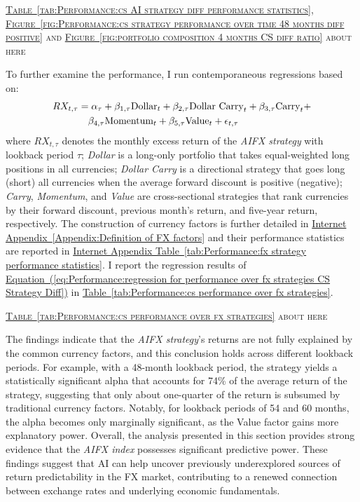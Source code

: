 \documentclass[12pt,oneside,letter]{article}
\newcommand*{\mytab}[1]{\hyperref[{#1}]{Table~\ref*{#1}}}
\newcommand*{\myfig}[1]{\hyperref[{#1}]{Figure~\ref*{#1}}}
\newcommand*{\myeq}[1]{\hyperref[{#1}]{Equation~(\ref*{#1})}}
\newcommand*{\mytabIA}[1]{\hyperref[{#1}]{Internet Appendix Table~\ref*{#1}}}
\newcommand*{\mysecIA}[1]{\hyperref[{#1}]{Internet Appendix~\ref*{#1}}}
\begin{document}
		\begin{center}
			 \textsc{\mytab{tab:Performance:cs AI strategy diff performance statistics}, \myfig{fig:Performance:cs strategy performance over time 48 months diff positive} and \myfig{fig:portfolio composition 4 months CS diff ratio} about here} 
		\end{center}
		To further examine the performance, I run contemporaneous regressions based on:
		\begin{align}
			RX_{t,\tau} &= \alpha_{\tau} + \beta_{1,\tau} \text{Dollar}_{t} + \beta_{2,\tau} \text{Dollar 	Carry}_{t} + \beta_{3,\tau} \text{Carry}_{t} + \notag\\ &\quad  \beta_{4,\tau} \text{Momentum}_{t}  +  \beta_{5,\tau} \text{Value}_{t}  + \epsilon_{t,\tau}
			\label{eq:Performance:regression for performance over fx strategies CS Strategy Diff}
		\end{align}
		where \( RX_{t,\tau} \) denotes the monthly excess return of the \textit{AIFX strategy} with lookback period \( \tau \); \textit{Dollar} is a long-only portfolio that takes equal-weighted long positions in all currencies; \textit{Dollar Carry} is a directional strategy that goes long (short) all currencies when the average forward discount is positive (negative); \textit{Carry}, \textit{Momentum}, and \textit{Value} are cross-sectional strategies that rank currencies by their forward discount, previous month's return, and five-year return, respectively. The construction of currency factors is further detailed in \mysecIA{Appendix:Definition of FX factors} and their performance statistics are reported in \mytabIA{tab:Performance:fx strategy performance statistics}. I report the regression results of \myeq{eq:Performance:regression for performance over fx strategies CS Strategy Diff} in \mytab{tab:Performance:cs performance over fx strategies}.
		\begin{center}
			\textsc{\mytab{tab:Performance:cs performance over fx strategies} about here}  
		\end{center}
		 The findings indicate that the \textit{AIFX strategy}’s returns are not fully explained by the common currency factors, and this conclusion holds across different lookback periods. For example, with a 48-month lookback period, the strategy yields a statistically significant alpha that accounts for 74\% of the average return of the strategy, suggesting that only about one-quarter of the return is subsumed by traditional currency factors. Notably, for lookback periods of 54 and 60 months, the alpha becomes only marginally significant, as the Value factor gains more explanatory power. Overall, the analysis presented in this section provides strong evidence that the \textit{AIFX index} possesses significant predictive power. These findings suggest that AI can help uncover previously underexplored sources of return predictability in the FX market, contributing to a renewed connection between exchange rates and underlying economic fundamentals.
		
\end{document}
